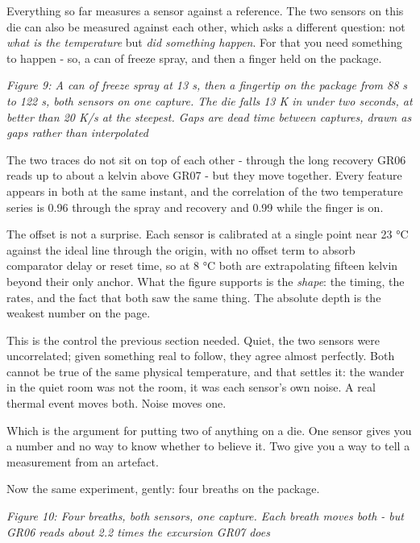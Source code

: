 Everything so far measures a sensor against a reference. The two sensors
on this die can also be measured against each other, which asks a
different question: not \emph{what is the temperature} but \emph{did
something happen}. For that you need something to happen - so, a can of
freeze spray, and then a finger held on the package.


{
\centering
{}
}

\emph{Figure 9: A can of freeze spray at 13 s, then a fingertip on the
package from 88 s to 122 s, both sensors on one capture. The die falls
13 K in under two seconds, at better than 20 K/s at the steepest. Gaps
are dead time between captures, drawn as gaps rather than interpolated}

The two traces do not sit on top of each other - through the long
recovery GR06 reads up to about a kelvin above GR07 - but they move
together. Every feature appears in both at the same instant, and the
correlation of the two temperature series is 0.96 through the spray and
recovery and 0.99 while the finger is on.

The offset is not a surprise. Each sensor is calibrated at a single
point near 23 °C against the ideal line through the origin, with no
offset term to absorb comparator delay or reset time, so at 8 °C both
are extrapolating fifteen kelvin beyond their only anchor. What the
figure supports is the \emph{shape}: the timing, the rates, and the fact
that both saw the same thing. The absolute depth is the weakest number
on the page.

This is the control the previous section needed. Quiet, the two sensors
were uncorrelated; given something real to follow, they agree almost
perfectly. Both cannot be true of the same physical temperature, and
that settles it: the wander in the quiet room was not the room, it was
each sensor's own noise. A real thermal event moves both. Noise moves
one.

Which is the argument for putting two of anything on a die. One sensor
gives you a number and no way to know whether to believe it. Two give
you a way to tell a measurement from an artefact.

Now the same experiment, gently: four breaths on the package.


{
\centering
{}
}

\emph{Figure 10: Four breaths, both sensors, one capture. Each breath
moves both - but GR06 reads about 2.2 times the excursion GR07 does}

